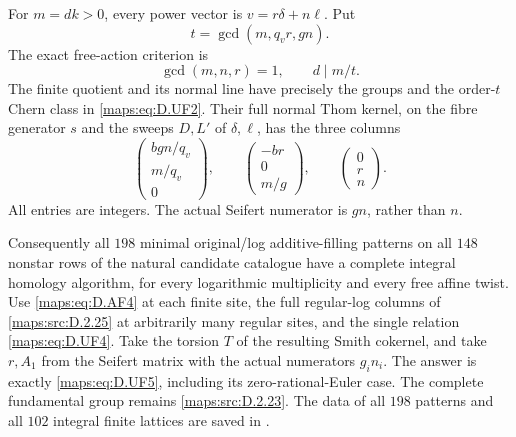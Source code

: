 \begin{theorem}
For $m=dk>0$, every power vector is $v=r\delta+n\ell$.
Put
\[
 t=\gcd(m,q_vr,gn).
\]
The exact free-action criterion is
\[
 \gcd(m,n,r)=1,\qquad d\mid m/t.                            \tag{D.AF3}\label{maps:eq:D.AF3}
\]
The finite quotient and its normal line have precisely the
groups and the order-$t$ Chern class in \eqref{maps:eq:D.UF2}.
Their full normal Thom kernel, on the fibre generator $s$
and the sweeps $D,L'$ of $\delta,\ell$, has the three columns
\[
 \begin{pmatrix}bgn/q_v\\m/q_v\\0\end{pmatrix},\qquad
 \begin{pmatrix}-br\\0\\m/g\end{pmatrix},\qquad
 \begin{pmatrix}0\\r\\n\end{pmatrix}.                     \tag{D.AF4}\label{maps:eq:D.AF4}
\]
All entries are integers. The actual Seifert numerator is
$gn$, rather than $n$.

Consequently all $198$ minimal original/log additive-filling
patterns on all $148$ nonstar rows of the natural candidate
catalogue have a complete integral homology algorithm, for
every logarithmic multiplicity and every free affine twist.
Use \eqref{maps:eq:D.AF4} at each finite site, the full regular-log columns
of \ref{maps:src:D.2.25} at arbitrarily many regular sites, and the single
relation \eqref{maps:eq:D.UF4}. Take the torsion $T$ of the resulting Smith
cokernel, and take $r,A_1$ from the Seifert matrix with the
actual numerators $g_i n_i$. The answer is exactly \eqref{maps:eq:D.UF5},
including its zero-rational-Euler case. The complete
fundamental group remains \ref{maps:src:D.2.23}. The data of all $198$
patterns and all $102$ integral finite lattices are saved in
.


\end{theorem}
